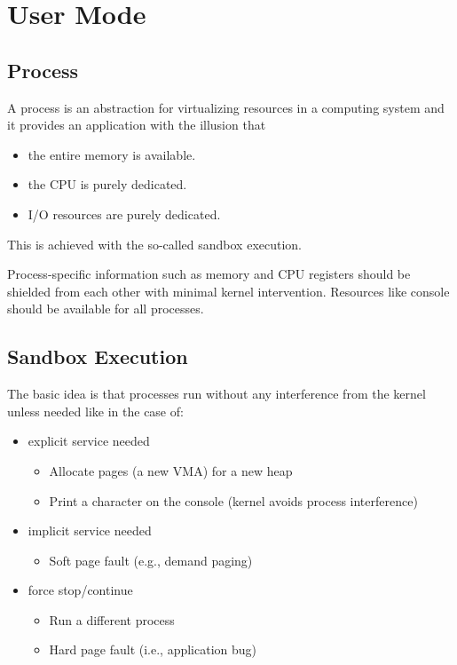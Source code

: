 \section{User Mode}

\subsection{Process}

A process is an abstraction for virtualizing resources in a computing system and it provides an application with the illusion that
\begin{itemize}
    \item the entire memory is available.
    \item the CPU is purely dedicated.
    \item I/O resources are purely dedicated.
\end{itemize}
This is achieved with the so-called sandbox execution.

\newpar{}

Process-specific information such as memory and CPU registers should be shielded from each other with minimal kernel intervention. Resources like console should be available for all processes.

\subsection{Sandbox Execution}
The basic idea is that processes run without any interference from the kernel unless needed like in the case of:
\begin{itemize}
    \item explicit service needed
          \begin{itemize}
              \item Allocate pages (a new VMA) for a new heap
              \item Print a character on the console (kernel avoids process interference)
          \end{itemize}
    \item implicit service needed
          \begin{itemize}
              \item Soft page fault (e.g., demand paging)
          \end{itemize}
    \item force stop/continue
          \begin{itemize}
              \item Run a different process
              \item Hard page fault (i.e., application bug)
          \end{itemize}
\end{itemize}

